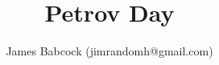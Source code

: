\documentclass{article}
\begin{document}
\author{James Babcock (jimrandomh@gmail.com)}
\title{Petrov Day}


%



\end{document}
